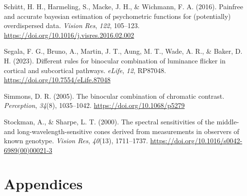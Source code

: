 \documentclass[
]{article}
\newlength{\cslhangindent}
\newlength{\cslentryspacingunit} %
\newenvironment{CSLReferences}[2] %
 {%
  \setlength{\parindent}{0pt}
  \ifodd #1
  \let\oldpar\par
  \def\par{\hangindent=\cslhangindent\oldpar}
  \fi
  \setlength{\parskip}{#2\cslentryspacingunit}
 }%
 {}
\begin{document}
\begin{CSLReferences}{1}{0}
\leavevmode{}%
Schütt, H. H., Harmeling, S., Macke, J. H., \& Wichmann, F. A. (2016). Painfree and accurate bayesian estimation of psychometric functions for (potentially) overdispersed data. \emph{Vision Res}, \emph{122}, 105--123. \url{https://doi.org/10.1016/j.visres.2016.02.002}

\leavevmode{}%
Segala, F. G., Bruno, A., Martin, J. T., Aung, M. T., Wade, A. R., \& Baker, D. H. (2023). Different rules for binocular combination of luminance flicker in cortical and subcortical pathways. \emph{eLife}, \emph{12}, RP87048. \url{https://doi.org/10.7554/eLife.87048}

\leavevmode{}%
Simmons, D. R. (2005). The binocular combination of chromatic contrast. \emph{Perception}, \emph{34}(8), 1035--1042. \url{https://doi.org/10.1068/p5279}

\leavevmode{}%
Stockman, A., \& Sharpe, L. T. (2000). The spectral sensitivities of the middle- and long-wavelength-sensitive cones derived from measurements in observers of known genotype. \emph{Vision Res}, \emph{40}(13), 1711--1737. \url{https://doi.org/10.1016/s0042-6989(00)00021-3}

\end{CSLReferences}

\hypertarget{appendices}{%
\section{Appendices}\label{appendices}}

\setcounter{table}{0}  \renewcommand{\thetable}{A\arabic{table}} \setcounter{figure}{0} \renewcommand{\thefigure}{A\arabic{figure}}
\end{document}
